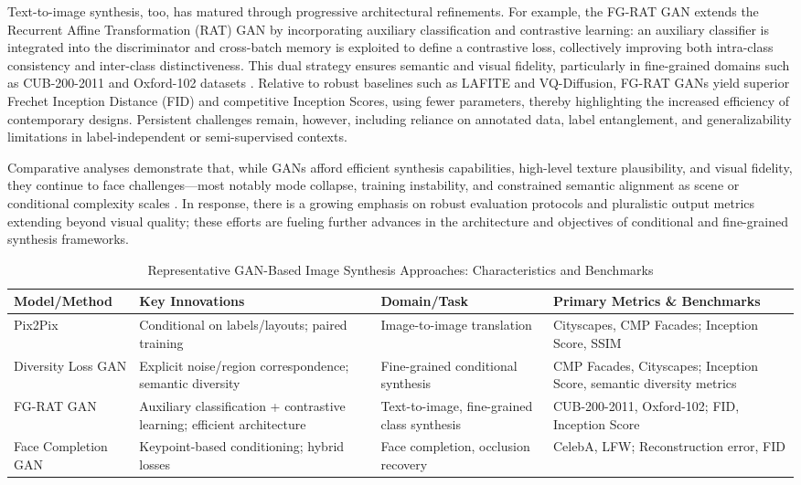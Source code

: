 \documentclass[11pt]{article}
\begin{document}
Text-to-image synthesis, too, has matured through progressive architectural refinements. For example, the FG-RAT GAN extends the Recurrent Affine Transformation (RAT) GAN by incorporating auxiliary classification and contrastive learning: an auxiliary classifier is integrated into the discriminator and cross-batch memory is exploited to define a contrastive loss, collectively improving both intra-class consistency and inter-class distinctiveness. This dual strategy ensures semantic and visual fidelity, particularly in fine-grained domains such as CUB-200-2011 and Oxford-102 datasets \cite{ref101}. Relative to robust baselines such as LAFITE and VQ-Diffusion, FG-RAT GANs yield superior Frechet Inception Distance (FID) and competitive Inception Scores, using fewer parameters, thereby highlighting the increased efficiency of contemporary designs. Persistent challenges remain, however, including reliance on annotated data, label entanglement, and generalizability limitations in label-independent or semi-supervised contexts.

Comparative analyses demonstrate that, while GANs afford efficient synthesis capabilities, high-level texture plausibility, and visual fidelity, they continue to face challenges—most notably mode collapse, training instability, and constrained semantic alignment as scene or conditional complexity scales \cite{ref93, ref95, ref101}. In response, there is a growing emphasis on robust evaluation protocols and pluralistic output metrics extending beyond visual quality; these efforts are fueling further advances in the architecture and objectives of conditional and fine-grained synthesis frameworks.

\begin{table}[ht]
\centering
\caption{Representative GAN-Based Image Synthesis Approaches: Characteristics and Benchmarks}
\label{tab:gan_comparison}
\begin{tabular}{|l|p{3.5cm}|p{3cm}|p{3.5cm}|}
\hline
\textbf{Model/Method} & \textbf{Key Innovations} & \textbf{Domain/Task} & \textbf{Primary Metrics \& Benchmarks} \\ \hline
Pix2Pix & Conditional on labels/layouts; paired training & Image-to-image translation & Cityscapes, CMP Facades; Inception Score, SSIM \\ \hline
Diversity Loss GAN & Explicit noise/region correspondence; semantic diversity & Fine-grained conditional synthesis & CMP Facades, Cityscapes; Inception Score, semantic diversity metrics \\ \hline
FG-RAT GAN & Auxiliary classification + contrastive learning; efficient architecture & Text-to-image, fine-grained class synthesis & CUB-200-2011, Oxford-102; FID, Inception Score \\ \hline
Face Completion GAN & Keypoint-based conditioning; hybrid losses & Face completion, occlusion recovery & CelebA, LFW; Reconstruction error, FID \\ \hline
\end{tabular}
\end{table}
\end{document}
